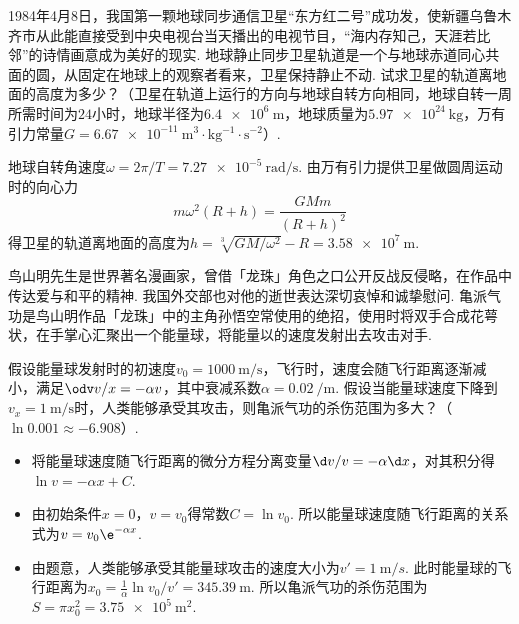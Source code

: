 \begin{problem}
    1984年4月8日，我国第一颗地球同步通信卫星``东方红二号''成功发，使新疆乌鲁木齐市从此能直接受到中央电视台当天播出的电视节目，``海内存知己，天涯若比邻''的诗情画意成为美好的现实. 地球静止同步卫星轨道是一个与地球赤道同心共面的圆，从固定在地球上的观察者看来，卫星保持静止不动. 试求卫星的轨道离地面的高度为多少？（卫星在轨道上运行的方向与地球自转方向相同，地球自转一周所需时间为$24$小时，地球半径为$\qty{6.4e6}\m$，地球质量为$\qty{5.97e24}\kg$，万有引力常量$G=\qty{6.67e-11}{\m^3\cdot\kg^{-1}\cdot\s^{-2}}$）.
\end{problem}
\begin{solution}
    地球自转角速度$\omega=2\pi/T=\qty{7.27e-5}{\radian/\s}$. 由万有引力提供卫星做圆周运动时的向心力
    \[m\omega^2(R+h)=\frac{GMm}{(R+h)^2}\]
    得卫星的轨道离地面的高度为$h=\sqrt[3]{GM/\omega^2}-R=\qty{3.58e7}\m$.
\end{solution}

\begin{problem}
    鸟山明先生是世界著名漫画家，曾借「龙珠」角色之口公开反战反侵略，在作品中传达爱与和平的精神. 我国外交部也对他的逝世表达深切哀悼和诚挚慰问. 亀派气功是鸟山明作品「龙珠」中的主角孙悟空常使用的绝招，使用时将双手合成花萼状，在手掌心汇聚出一个能量球，将能量以的速度发射出去攻击对手.

    假设能量球发射时的初速度$v_0=\qty{1000}{\m/\s}$，飞行时，速度会随飞行距离逐渐减小，满足$\odv v/x=-\alpha v$，其中衰减系数$\alpha=\qty{0.02}{/\m}$. 假设当能量球速度下降到$v _x=\qty{1}{\m/\s}$时，人类能够承受其攻击，则亀派气功的杀伤范围为多大？（$\ln0.001\approx-6.908$）.
\end{problem}
\begin{solution}\leavevmode
    \begin{itemize}
        \item 将能量球速度随飞行距离的微分方程分离变量$\d v/v=-\alpha\d x$，对其积分得$\ln v=-\alpha x+C$.
        \item 由初始条件$x=0$，$v=v_0$得常数$C=\ln v_0$. 所以能量球速度随飞行距离的关系式为$v=v_0\e^{-\alpha x}$.
        \item 由题意，人类能够承受其能量球攻击的速度大小为$v'=\qty{1}{\m/s}$. 此时能量球的飞行距离为$x_0=\frac1\alpha\ln v_0/v'=\qty{345.39}\m$. 所以亀派气功的杀伤范围为$S=\pi x_0^2=\qty{3.75e5}{\m^2}$.
    \end{itemize}
\end{solution}

